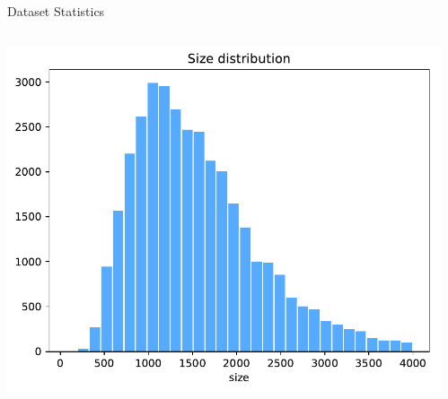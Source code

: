 \documentclass[newPxFont,fullfooter,sectionpages, progressbar]{beamer}
\begin{document}
\begin{frame}{Dataset Statistics}

	\begin{columns}
		\begin{column}{.48\linewidth}
			\includegraphics[width=\textwidth]{images/size_hist.pdf}
		\end{column}

		\begin{column}{.48\linewidth}
		\end{column}
	\end{columns}
\end{frame}



\newcommand*{\vcenteredhbox}[1]{#1}

\end{document}
